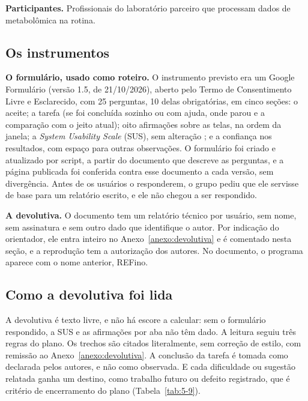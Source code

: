 \textbf{Participantes.} Profissionais do laboratório parceiro que processam dados de metabolômica na rotina.

\subsection{Os instrumentos}\label{sec:5-4-2}

\textbf{O formulário, usado como roteiro.} O instrumento previsto era um Google Formulário (versão 1.5, de 21/10/2026), aberto pelo Termo de Consentimento Livre e Esclarecido, com 25 perguntas, 10 delas obrigatórias, em cinco seções: o aceite; a tarefa (se foi concluída sozinho ou com ajuda, onde parou e a comparação com o jeito atual); oito afirmações sobre as telas, na ordem da janela; a \textit{System Usability Scale} (SUS), sem alteração \cite{brooke1996sus}; e a confiança nos resultados, com espaço para outras observações. O formulário foi criado e atualizado por script, a partir do documento que descreve as perguntas, e a página publicada foi conferida contra esse documento a cada versão, sem divergência. Antes de os usuários o responderem, o grupo pediu que ele servisse de base para um relatório escrito, e ele não chegou a ser respondido.


\textbf{A devolutiva.} O documento tem um relatório técnico por usuário, sem nome, sem assinatura e sem outro dado que identifique o autor. Por indicação do orientador, ele entra inteiro no Anexo~\ref{anexo:devolutiva} e é comentado nesta seção, e a reprodução tem a autorização dos autores. No documento, o programa aparece com o nome anterior, REFino.


\subsection{Como a devolutiva foi lida}\label{sec:5-4-3}

A devolutiva é texto livre, e não há escore a calcular: sem o formulário respondido, a SUS e as afirmações por aba não têm dado. A leitura seguiu três regras do plano. Os trechos são citados literalmente, sem correção de estilo, com remissão ao Anexo~\ref{anexo:devolutiva}. A conclusão da tarefa é tomada como declarada pelos autores, e não como observada. E cada dificuldade ou sugestão relatada ganha um destino, como trabalho futuro ou defeito registrado, que é critério de encerramento do plano (Tabela~\ref{tab:5-9}).

